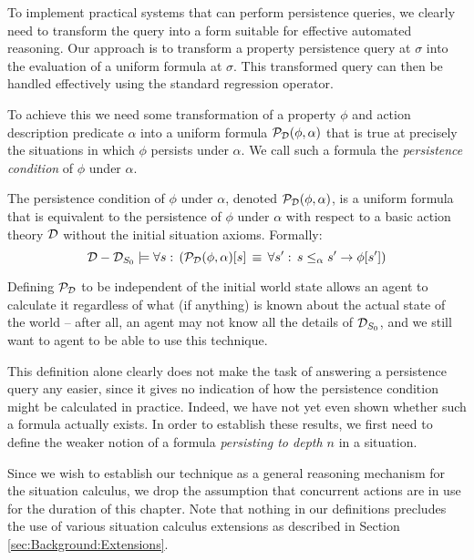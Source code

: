 To implement practical systems that can perform persistence queries,
we clearly need to transform the query into a form suitable for effective
automated reasoning. Our approach is to transform a property persistence
query at $\sigma$ into the evaluation of a uniform formula at $\sigma$.
This transformed query can then be handled effectively using the standard
regression operator.

To achieve this we need some transformation of a property $\phi$
and action description predicate $\alpha$ into a uniform formula
$\mathcal{P}_{\mathcal{D}}(\phi,\alpha)$ that is true at precisely the situations
in which $\phi$ persists under $\alpha$. We call such a formula
the \emph{persistence condition} of $\phi$ under $\alpha$.

\begin{defnL}
 The persistence condition of $\phi$
under $\alpha$, denoted $\mathcal{P}_{\mathcal{D}}(\phi,\alpha)$, is a uniform
formula that is equivalent to the persistence of $\phi$ under $\alpha$
with respect to a basic action theory $\mathcal{D}$ without the initial situation
axioms. Formally:\label{def:persistence-condition}\[
\mathcal{D}-\mathcal{D}_{S_{0}}\models\forall s:\,\left(\mathcal{P}_{\mathcal{D}}(\phi,\alpha)[s]\,\equiv\,\forall s':\, s\leq_{\alpha}s'\rightarrow\phi[s']\right)\]

\end{defnL}
Defining $\mathcal{P}_{\mathcal{D}}$ to be independent of the initial world state
allows an agent to calculate it regardless of what (if anything) is
known about the actual state of the world -- after all, an agent may
not know all the details of $\mathcal{D}_{S_{0}}$, and we still want to agent
to be able to use this technique.

This definition alone clearly does not make the task of answering
a persistence query any easier, since it gives no indication of how
the persistence condition might be calculated in practice. Indeed,
we have not yet even shown whether such a formula actually exists.
In order to establish these results, we first need to define the weaker
notion of a formula \emph{persisting to depth $n$} in a situation.

Since we wish to establish our technique as a general reasoning mechanism
for the situation calculus, we drop the assumption that concurrent
actions are in use for the duration of this chapter. Note that nothing
in our definitions precludes the use of various situation calculus
extensions as described in Section \ref{sec:Background:Extensions}.

